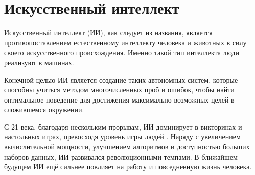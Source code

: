 \section{Искусственный интеллект} \label{ch1:ai}

Искусственный интеллект \cite{Crevier93} (\hyperref[acr:ai]{ИИ}), как следует из названия, является противопоставлением естественному интеллекту человека и животных в силу своего искусственного происхождения. Именно такой тип интеллекта люди реализуют в машинах.

Конечной целью ИИ является создание таких автономных систем, которые способны учиться методом многочисленных проб и ошибок, чтобы найти оптимальное поведение для достижения максимально возможных целей в сложившемся окружении. \cite{RussellAndNorvig-AI-modern-approach}

С 21 века, благодаря нескольким прорывам, ИИ доминирует в викторинах и настольных играх, превосходя уровень игры людей \cite{Watson} \cite{AlphaGo}. Наряду с увеличением вычислительной мощности, улучшением алгоритмов и доступностью больших наборов данных, ИИ развивался революционными темпами. В ближайшем будущем ИИ ещё сильнее повлияет на работу и повседневную жизнь человека.





%
\newpage %
